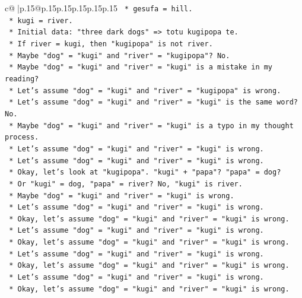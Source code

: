 \documentclass{article}
\begin{document}
{\begin{supertabular}{c@{$\;$}|p{.15\linewidth}@{}p{.15\linewidth}p{.15\linewidth}p{.15\linewidth}p{.15\linewidth}p{.15\linewidth}}
{{{\texttt{        *   gesufa = hill.} \\
\texttt{        *   kugi = river.} \\
\texttt{    *   Initial data: "three dark dogs" => totu kugipopa te.} \\
\texttt{        *   If river = kugi, then "kugipopa" is not river.} \\
\texttt{        *   Maybe "dog" = "kugi" and "river" = "kugipopa"? No.} \\
\texttt{        *   Maybe "dog" = "kugi" and "river" = "kugi" is a mistake in my reading?} \\
\texttt{        *   Let's assume "dog" = "kugi" and "river" = "kugipopa" is wrong.} \\
\texttt{        *   Let's assume "dog" = "kugi" and "river" = "kugi" is the same word? No.} \\
\texttt{        *   Maybe "dog" = "kugi" and "river" = "kugi" is a typo in my thought process.} \\
\texttt{        *   Let's assume "dog" = "kugi" and "river" = "kugi" is wrong.} \\
\texttt{        *   Let's assume "dog" = "kugi" and "river" = "kugi" is wrong.} \\
\texttt{        *   Okay, let's look at "kugipopa". "kugi" + "papa"? "papa" = dog?} \\
\texttt{        *   Or "kugi" = dog, "papa" = river? No, "kugi" is river.} \\
\texttt{        *   Maybe "dog" = "kugi" and "river" = "kugi" is wrong.} \\
\texttt{        *   Let's assume "dog" = "kugi" and "river" = "kugi" is wrong.} \\
\texttt{        *   Okay, let's assume "dog" = "kugi" and "river" = "kugi" is wrong.} \\
\texttt{        *   Let's assume "dog" = "kugi" and "river" = "kugi" is wrong.} \\
\texttt{        *   Okay, let's assume "dog" = "kugi" and "river" = "kugi" is wrong.} \\
\texttt{        *   Let's assume "dog" = "kugi" and "river" = "kugi" is wrong.} \\
\texttt{        *   Okay, let's assume "dog" = "kugi" and "river" = "kugi" is wrong.} \\
\texttt{        *   Let's assume "dog" = "kugi" and "river" = "kugi" is wrong.} \\
\texttt{        *   Okay, let's assume "dog" = "kugi" and "river" = "kugi" is wrong.} \\
}}}
\end{supertabular}}
\end{document}
